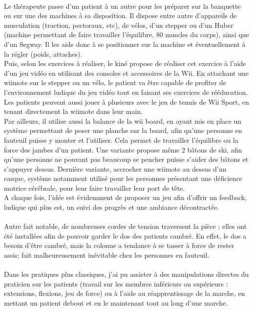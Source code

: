\paragraph{}
Le thérapeute passe d'un patient à un autre pour les préparer sur la banquette ou sur une des machines à sa disposition. Il dispose entre autre d'appareils de musculation (traction, pectoraux, etc), de vélos, d'un stepper ou d'un Huber (machine permettant de faire travailler l'équilibre, 80 muscles du corps), ainsi que d'un Segway. Il les aide donc à se positionner sur la machine et éventuellement à la régler (poids, attaches).\\
Puis, selon les exercices à réaliser, le kiné propose de réaliser cet exercice à l'aide d'un jeu vidéo en utilisant des consoles et accessoires de la Wii. En attachant une wiimote sur le stepper ou un vélo, le patient va être capable de profiter de l'environnement ludique du jeu vidéo tout en faisant ses exercices de rééducation. Les patients peuvent aussi jouer à plusieurs avec le jeu de tennis de Wii Sport, en tenant directement la wiimote dans leur main.\\
Par ailleurs, il utilise aussi la balance de la wii board, en ayant mis en place un système permettant de poser une planche sur la board, afin qu'une personne en fauteuil puisse y monter et l'utiliser. Cela permet de travailler l'équilibre ou la force des jambes d'un patient. Une variante propose même 2 bâtons de ski, afin qu'une personne ne pouvant pas beaucoup se pencher puisse s'aider des bâtons et s'appuyer dessus. Dernière variante, accrocher une wiimote au dessus d'un casque, système notamment utilisé pour les personnes présentant une déficience motrice cérébrale, pour leur faire travailler leur port de tête.\\
A chaque fois, l'idée est évidemment de proposer un jeu afin d'offrir un feedback, ludique qui plus est, un suivi des progrès et une ambiance décontractée.

\paragraph{}Autre fait notable, de nombreuses cordes de tension traversent la pièce ; elles ont été installées afin de pouvoir garder le dos des patients cambré. En effet, le dos a besoin d'être cambré, mais la colonne a tendance à se tasser à force de rester assis; fait malheureusement inévitable chez les personnes en fauteuil.

\paragraph{}Dans les pratiques plus classiques, j'ai pu assister à des manipulations directes du praticien sur les patients (travail sur les membres inférieurs ou supérieurs : extensions, flexions, jeu de force) ou à l'aide au réapprentissage de la marche, en mettant un patient debout et en le maintenant tout au long d'une marche.

